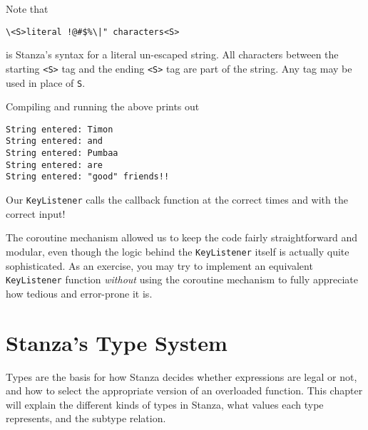 \documentclass[10pt,oneside]{book}
\begin{document}
Note that 
\begin{lstlisting}
\<S>literal !@#$%\|" characters<S>
\end{lstlisting}
is Stanza's syntax for a literal un-escaped string. All characters between the starting \texttt{\frenchspacing <S>} tag and the ending \texttt{\frenchspacing <S>} tag are part of the string. Any tag may be used in place of \texttt{\frenchspacing S}.

Compiling and running the above prints out
\begin{lstlisting}
String entered: Timon
String entered: and
String entered: Pumbaa
String entered: are
String entered: "good" friends!!
\end{lstlisting}

Our \texttt{\frenchspacing KeyListener} calls the callback function at the correct times and with the correct input! 

The coroutine mechanism allowed us to keep the code fairly straightforward and modular, even though the logic behind the \texttt{\frenchspacing KeyListener} itself is actually quite sophisticated. As an exercise, you may try to implement an equivalent \texttt{\frenchspacing KeyListener} function {\em without} using the coroutine mechanism to fully appreciate how tedious and error-prone it is.

\chapter{Stanza's Type System}
Types are the basis for how Stanza decides whether expressions are legal or not, and how to select the appropriate version of an overloaded function. This chapter will explain the different kinds of types in Stanza, what values each type represents, and the subtype relation.
\end{document}
